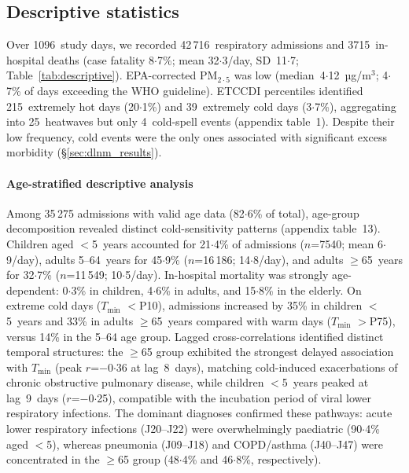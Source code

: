 \documentclass[review,number]{elsarticle}
\begin{document}
\subsection{Descriptive statistics}

Over 1096~study days, we recorded 42\,716~respiratory admissions and
3715~in-hospital deaths (case fatality 8${\cdot}$7\%; mean
32${\cdot}$3/day, SD~11${\cdot}$7; Table~\ref{tab:descriptive}).
EPA-corrected $\text{PM}_{2{\cdot}5}$ was low (median~4${\cdot}$12~µg/m$^3$;
4${\cdot}$7\% of days exceeding the WHO guideline). ETCCDI percentiles
identified 215~extremely hot days (20${\cdot}$1\%) and 39~extremely
cold days (3${\cdot}$7\%), aggregating into 25~heatwaves but only
4~cold-spell events (appendix table~1). Despite their low frequency, cold
events were the only ones associated with significant excess morbidity
(§\ref{sec:dlnm_results}).

\paragraph{Age-stratified descriptive analysis}
Among 35\,275 admissions with valid age data (82${\cdot}$6\% of
total), age-group decomposition revealed distinct cold-sensitivity
patterns (appendix table~13). Children aged $<$5~years
accounted for 21${\cdot}$4\% of admissions ($n$=7540; mean
6${\cdot}$9/day), adults 5--64~years for 45${\cdot}$9\%
($n$=16\,186; 14${\cdot}$8/day), and adults $\geq$65~years for
32${\cdot}$7\% ($n$=11\,549; 10${\cdot}$5/day). In-hospital
mortality was strongly age-dependent: 0${\cdot}$3\% in children,
4${\cdot}$6\% in adults, and 15${\cdot}$8\% in the elderly. On
extreme cold days ($T_\mathrm{min}$ $<$P10), admissions increased
by 35\% in children $<$5~years and 33\% in adults $\geq$65~years
compared with warm days ($T_\mathrm{min}$ $>$P75), versus 14\% in
the 5--64 age group. Lagged cross-correlations identified distinct
temporal structures: the $\geq$65 group exhibited the strongest
delayed association with $T_\mathrm{min}$ (peak $r$=$-$0${\cdot}$36
at lag~8~days), matching cold-induced exacerbations of chronic
obstructive pulmonary disease, while children $<$5~years peaked at
lag~9~days ($r$=$-$0${\cdot}$25), compatible with the incubation
period of viral lower respiratory infections. The dominant diagnoses
confirmed these pathways: acute lower respiratory infections
(J20--J22) were overwhelmingly paediatric (90${\cdot}$4\% aged
$<$5), whereas pneumonia (J09--J18) and COPD/asthma (J40--J47) were
concentrated in the $\geq$65 group (48${\cdot}$4\% and
46${\cdot}$8\%, respectively).
\end{document}
